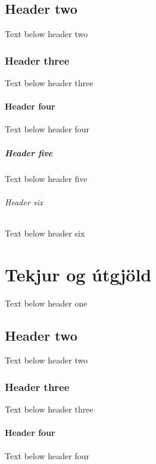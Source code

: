 \documentclass[a4paper,10pt,icelandic]{sphinxmanual}
\begin{document}
\section{Header two}
\label{\detokenize{fjarhagsleg-markmid/index:header-two}}
\sphinxAtStartPar
Text below header two


\subsection{Header three}
\label{\detokenize{fjarhagsleg-markmid/index:header-three}}
\sphinxAtStartPar
Text below header three


\subsubsection{Header four}
\label{\detokenize{fjarhagsleg-markmid/index:header-four}}
\sphinxAtStartPar
Text below header four


\paragraph{Header five}
\label{\detokenize{fjarhagsleg-markmid/index:header-five}}
\sphinxAtStartPar
Text below header five


\subparagraph{Header six}
\label{\detokenize{fjarhagsleg-markmid/index:header-six}}
\sphinxAtStartPar
Text below header six

\sphinxstepscope


\chapter{Tekjur og útgjöld}
\label{\detokenize{tekjur-og-utgjold/index:tekjur-og-utgjold}}\label{\detokenize{tekjur-og-utgjold/index::doc}}
\sphinxAtStartPar
Text below header one


\section{Header two}
\label{\detokenize{tekjur-og-utgjold/index:header-two}}
\sphinxAtStartPar
Text below header two


\subsection{Header three}
\label{\detokenize{tekjur-og-utgjold/index:header-three}}
\sphinxAtStartPar
Text below header three


\subsubsection{Header four}
\label{\detokenize{tekjur-og-utgjold/index:header-four}}
\sphinxAtStartPar
Text below header four
\end{document}
